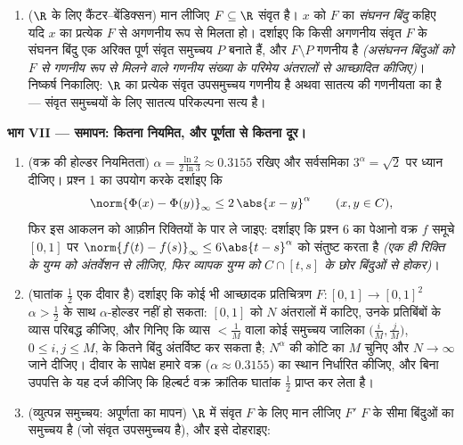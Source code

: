 \begin{problem}
\begin{enumerate}[resume]
        $K = \{0\} \cup
        \{\frac1n : n \geq 1\}$।
  \item ($\R$ के लिए कैंटर--बेंडिक्सन) मान लीजिए $F \subseteq \R$ संवृत है।
        $x$ को $F$ का \emph{संघनन बिंदु} कहिए यदि $x$ का
        प्रत्येक  $F$ से अगणनीय रूप से मिलता हो।
        दर्शाइए कि किसी अगणनीय संवृत $F$ के संघनन बिंदु एक
        अरिक्त पूर्ण संवृत समुच्चय $P$ बनाते हैं, और $F
        \setminus P$
        गणनीय है \emph{(असंघनन बिंदुओं को $F$ से गणनीय रूप से
        मिलने वाले गणनीय संख्या के परिमेय अंतरालों से आच्छादित
        कीजिए)}। निष्कर्ष निकालिए: $\R$ का प्रत्येक संवृत
        उपसमुच्चय गणनीय है अथवा सातत्य की गणनीयता का है ---
        संवृत समुच्चयों के लिए सातत्य परिकल्पना सत्य है।
\end{enumerate}

\medskip
\noindent\textbf{भाग VII --- समापन: कितना नियमित, और पूर्णता से
कितना दूर।}
\begin{enumerate}[resume]
  \item (वक्र की होल्डर नियमितता) $\alpha =
        \frac{\ln 2}{2\ln 3} \approx 0.3155$ रखिए और सर्वसमिका $3^\alpha = \sqrt2$
        पर ध्यान दीजिए। प्रश्न 1 का उपयोग करके दर्शाइए कि
        \[
        \norm{\Phi(x) - \Phi(y)}_\infty \leq 2\,\abs{x -
        y}^\alpha \qquad (x, y \in C),
        \]
        फिर इस आकलन को आफ़ीन रिक्तियों के पार ले जाइए: दर्शाइए कि
        प्रश्न 6 का पेआनो वक्र $f$ समूचे $[0,1]$ पर $\norm{f(t) - f(s)}_\infty \leq 6\abs{t - s}^\alpha$ को
        संतुष्ट करता है \emph{(एक ही रिक्ति के युग्म को अंतर्वेशन
        से लीजिए, फिर व्यापक युग्म को $C \cap [t, s]$ के छोर बिंदुओं से
        होकर)}।
  \item (घातांक $\frac12$ एक दीवार है) दर्शाइए कि कोई भी आच्छादक
        प्रतिचित्रण $F \colon [0,1] \to [0,1]^2$ $\alpha > \frac12$ के साथ $\alpha$-होल्डर नहीं हो
        सकता: $[0,1]$ को $N$ अंतरालों में काटिए, उनके प्रतिबिंबों
        के व्यास परिबद्ध कीजिए, और गिनिए कि व्यास $< \frac1M$ वाला कोई
        समुच्चय जालिका $\bigl(\frac iM, \frac jM\bigr)$, $0 \leq i, j \leq M$, के कितने बिंदु अंतर्विष्ट कर
        सकता है; $N^\alpha$ की कोटि का $M$ चुनिए और $N \to \infty$ जाने
        दीजिए। दीवार के सापेक्ष हमारे वक्र ($\alpha \approx 0.3155$) का स्थान
        निर्धारित कीजिए, और बिना उपपत्ति के यह दर्ज कीजिए कि
        हिल्बर्ट वक्र क्रांतिक घातांक $\frac12$ प्राप्त कर लेता है।
  \item (व्युत्पन्न समुच्चय: अपूर्णता का मापन) $\R$ में संवृत
        $F$ के लिए मान लीजिए $F'$ $F$ के सीमा बिंदुओं का
        समुच्चय है (जो संवृत उपसमुच्चय है), और इसे दोहराइए:

\end{enumerate}
\end{problem}
